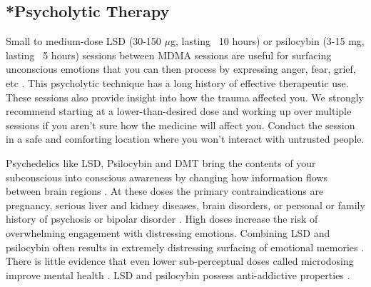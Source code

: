\documentclass[12pt,letterpaper]{article}
\begin{document}
\subsection{*Psycholytic Therapy}
\label{psychedelics}
Small to medium-dose LSD (30-150 $\mu$g, lasting ~10 hours) or psilocybin (3-15 mg, lasting ~5 hours) sessions between MDMA sessions are useful for surfacing unconscious emotions that you can then process by expressing anger, fear, grief, etc \cite{passiePsycholytic} . This psycholytic technique has a long history of effective therapeutic use. These sessions also provide insight into how the trauma affected you. We strongly recommend starting at a lower-than-desired dose and working up over multiple sessions if you aren't sure how the medicine will affect you. Conduct the session in a safe and comforting location where you won't interact with untrusted people. 

Psychedelics like LSD, Psilocybin and DMT bring the contents of your subconscious into conscious awareness by changing how information flows between brain regions \cite{tagliazucchiConnectivity} . At these doses the primary contraindications are pregnancy, serious liver and kidney diseases, brain disorders, or personal or family history of psychosis or bipolar disorder \cite{schlagPsychedelicAdverseEffects,passiePsycholytic}. High doses increase the risk of overwhelming engagement with distressing emotions. Combining LSD and psilocybin often results in extremely distressing surfacing of emotional memories \cite{colemanPsychedelicPsychotherapy}. There is little evidence that even lower sub-perceptual doses called microdosing improve mental health \cite{politoMicrodosing}. LSD and psilocybin possess anti-addictive properties \cite{principeAddiction}.
\end{document}
